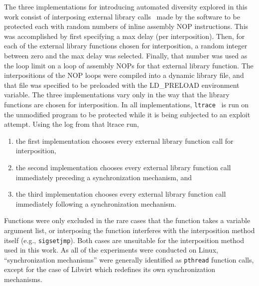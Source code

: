The three implementations for introducing automated diversity explored in this work consist of interposing external library calls~\cite{Conrad2009} made by the software to be protected each with random numbers of inline assembly NOP instructions.
This was accomplished by first specifying a max delay (per interposition).
Then, for each of the external library functions chosen for interposition, a random integer between zero and the max delay was selected.
Finally, that number was used as the loop limit on a loop of assembly NOPs for that external library function.
The interpositions of the NOP loops were compiled into a dynamic library file, and that file was specified to be preloaded with the LD\_PRELOAD environment variable.
The three implementations vary only in the way that the library functions are chosen for interposition.
In all implementations, \texttt{ltrace}~\cite{cespedesltrace} is run on the unmodified program to be protected while it is being subjected to an exploit attempt.
Using the log from that ltrace run,
\begin{enumerate}
	\item the first implementation chooses every external library function call for interposition,
	\item the second implementation chooses every external library function call immediately preceding a synchronization mechanism, and
	\item the third implementation chooses every external library function call immediately following a synchronization mechanism.
\end{enumerate}
Functions were only excluded in the rare cases that the function takes a
variable argument list, or interposing the function interferes with the
interposition method itself (e.g., \texttt{sigsetjmp}).
Both cases are unsuitable for the interposition method used in this work.
As all of the experiments were conducted on Linux, ``synchronization
mechanisms'' were generally identified as \texttt{pthread} function calls, except for the case of Libvirt which redefines its own synchronization mechanisms.
